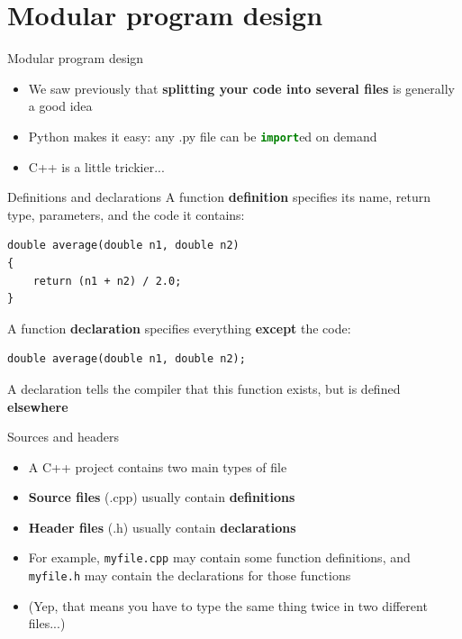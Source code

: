\part{Modular program design}
\frame{\partpage}

\begin{frame}[fragile]{Modular program design}
    \begin{itemize}
        \item We saw previously that \textbf{splitting your code into several files} is generally a good idea \pause
        \item Python makes it easy: any .py file can be \lstinline[language=Python]{import}ed on demand \pause
        \item C++ is a little trickier...
    \end{itemize}
\end{frame}

\begin{frame}[fragile]{Definitions and declarations}
    A function \textbf{definition} specifies its name, return type, parameters, and the code it contains:
    \begin{lstlisting}
double average(double n1, double n2)
{
    return (n1 + n2) / 2.0;
}
    \end{lstlisting}
    \pause
    A function \textbf{declaration} specifies everything \textbf{except} the code:
    \begin{lstlisting}
double average(double n1, double n2);
    \end{lstlisting}
    \pause
    A declaration tells the compiler that this function exists, but is defined \textbf{elsewhere}
\end{frame}

\begin{frame}[fragile]{Sources and headers}
    \begin{itemize}
        \item A C++ project contains two main types of file \pause
        \item \textbf{Source files} (.cpp) usually contain \textbf{definitions} \pause
        \item \textbf{Header files} (.h) usually contain \textbf{declarations} \pause
        \item For example, \texttt{myfile.cpp} may contain some function definitions,
            and \texttt{myfile.h} may contain the declarations for those functions \pause
        \item (Yep, that means you have to type the same thing twice in two different files...)
    \end{itemize}
\end{frame}

